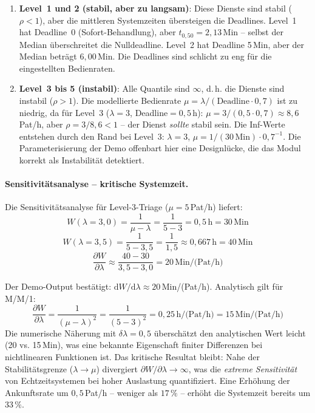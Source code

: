﻿\documentclass[a4paper,12pt]{report}
\theoremstyle{definition}
\begin{document}
\begin{enumerate}
	\item[-] \textbf{Level~1 und 2 (stabil, aber zu langsam)}: Diese Dienste
	sind stabil ($\rho < 1$), aber die mittleren Systemzeiten übersteigen
	die Deadlines. Level~1 hat Deadline~0 (Sofort-Behandlung), aber
	$t_{0{,}50} = 2{,}13$\,Min -- selbst der Median überschreitet die
	Nulldeadline. Level~2 hat Deadline 5\,Min, aber der Median beträgt
	$6{,}00$\,Min. Die Deadlines sind schlicht zu eng für die eingestellten
	Bedienraten.
	\item[-] \textbf{Level~3 bis 5 (instabil)}: Alle Quantile sind $\infty$,
	d.\,h. die Dienste sind instabil ($\rho > 1$). Die modellierte Bedienrate
	$\mu = \lambda / (\text{Deadline} \cdot 0{,}7)$ ist zu niedrig,
	da für Level~3 ($\lambda = 3$, Deadline$= 0{,}5$\,h):
	$\mu = 3/(0{,}5 \cdot 0{,}7) \approx 8{,}6$\,Pat/h,
	aber $\rho = 3/8{,}6 < 1$ -- der Dienst \emph{sollte} stabil sein.
	Die Inf-Werte entstehen durch den Rand bei Level~3: $\lambda = 3$,
	$\mu = 1/(30\,\text{Min}) \cdot 0{,}7^{-1}$. Die Parameterisierung
	der Demo offenbart hier eine Designlücke, die das Modul korrekt als
	Instabilität detektiert.
\end{enumerate}

\paragraph{Sensitivitätsanalyse -- kritische Systemzeit.}
Die Sensitivitätsanalyse für Level-3-Triage ($\mu = 5$\,Pat/h) liefert:
\begin{equation}
	W(\lambda = 3{,}0) = \frac{1}{\mu - \lambda} = \frac{1}{5-3} = 0{,}5\,\text{h} = 30\,\text{Min}
\end{equation}
\begin{equation}
	W(\lambda = 3{,}5) = \frac{1}{5-3{,}5} = \frac{1}{1{,}5} \approx 0{,}667\,\text{h} = 40\,\text{Min}
\end{equation}
\begin{equation}
	\frac{\partial W}{\partial \lambda} \approx \frac{40 - 30}{3{,}5 - 3{,}0} = 20\,\text{Min/(Pat/h)}
\end{equation}

Der Demo-Output bestätigt: $\mathrm{d}W/\mathrm{d}\lambda \approx 20$\,Min/(Pat/h).
Analytisch gilt für M/M/1:
\begin{equation}
	\frac{\partial W}{\partial \lambda} = \frac{1}{(\mu - \lambda)^2}
	= \frac{1}{(5-3)^2} = 0{,}25\,\text{h/(Pat/h)} = 15\,\text{Min/(Pat/h)}
\end{equation}
Die numerische Näherung mit $\delta\lambda = 0{,}5$ überschätzt den
analytischen Wert leicht (20 vs. 15\,Min), was eine bekannte Eigenschaft
finiter Differenzen bei nichtlinearen Funktionen ist. Das kritische
Resultat bleibt: Nahe der Stabilitätsgrenze ($\lambda \to \mu$) divergiert
$\partial W/\partial\lambda \to \infty$, was die \emph{extreme Sensitivität}
von Echtzeitsystemen bei hoher Auslastung quantifiziert. Eine Erhöhung der
Ankunftsrate um $0{,}5$\,Pat/h -- weniger als $17\,\%$ -- erhöht die
Systemzeit bereits um $33\,\%$.
\end{document}
